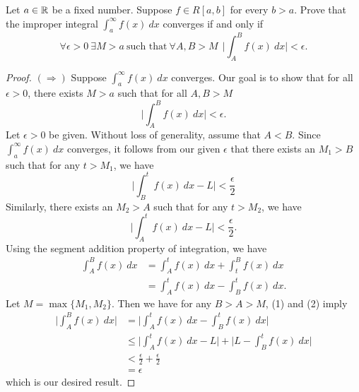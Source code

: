 \documentclass[a4paper]{article}
\begin{document}
\begin{problem}
    Let \( a \in \mathbb{R}  \) be a fixed number. Suppose \( f \in R[a,b] \) for every \( b > a  \). Prove that the improper integral \( \displaystyle \int_{ a }^{ \infty  }  f(x) \ dx  \) converges if and only if  
    \[  \forall \epsilon > 0 \ \exists M > a \ \text{such that} \ \forall A,B > M \ \ \Big|  \int_{ A }^{ B }  f(x) \ dx  \Big| < \epsilon.  \]
\end{problem}
\begin{proof}
\( (\Longrightarrow) \) Suppose \( \int_{ a }^{ \infty  } f(x) \ dx   \) converges. Our goal is to show that for all \( \epsilon > 0  \), there exists \( M > a  \) such that for all \( A,B > M  \)
\[  \Big|  \int_{ A }^{B }  f(x) \ dx  \Big|  < \epsilon. \]
Let \( \epsilon > 0  \) be given. Without loss of generality, assume that \( A  < B  \). Since \( \int_{ a }^{ \infty  } f(x) \ dx  \) converges, it follows from our given \( \epsilon  \) that there exists an \( {M}_{1} > B  \) such that for any \( t > {M}_{1} \), we have
\[  \Big|  \int_{ B }^{ t }  f(x) \ dx - L  \Big| < \frac{ \epsilon }{ 2 } \tag{1} \]
Similarly, there exists an \( {M}_{2} > A  \) such that for any \( t > {M}_{2} \), we have 
\[  \Big| \int_{  A  }^{ t } f(x) \ dx - L  \Big| < \frac{ \epsilon }{ 2 }. \tag{2} \]
Using the segment addition property of integration, we have 
\begin{align*}
    \int_{ A }^{ B }  f(x)  \ dx &= \int_{ A  }^{ t  }  f(x) \ dx + \int_{ t  }^{ B  }  f(x) \ dx  \\
                                 &= \int_{ A }^{ t }  f(x) \ dx - \int_{ B }^{ t } f(x) \ dx.
\end{align*}
Let \( M = \max\{{M}_{1}, {M}_{2}\} \). Then we have for any \( B > A > M \), (1) and (2) imply
\begin{align*}
    \Big| \int_{ A }^{ B } f(x) \ dx   \Big| &= \Big| \int_{ A  }^{ t  }  f(x) \ dx - \int_{ B }^{ t  }  f(x) \ dx  \Big|  \\
                                             &\leq \Big| \int_{ A }^{ t }  f(x) \ dx - L  \Big|  + \Big| L - \int_{ B }^{ t } f(x) \ dx \Big|  \\
                                             &< \frac{ \epsilon }{ 2 }  + \frac{ \epsilon }{ 2 } \\
                                             &= \epsilon
\end{align*}
which is our desired result.


\end{proof}
\end{document}

